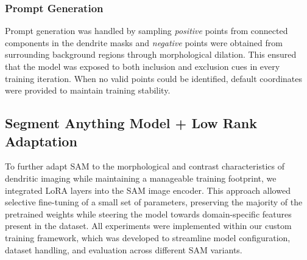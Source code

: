 \subsubsection{\textbf{Prompt Generation}}
Prompt generation was handled by sampling \textit{positive} points from connected components in the dendrite masks and \textit{negative} points were obtained from surrounding background regions through morphological dilation. This ensured that the model was exposed to both inclusion and exclusion cues in every training iteration. When no valid points could be identified, default coordinates were provided to maintain training stability.



\subsection{Segment Anything Model + Low Rank Adaptation}
To further adapt \gls{SAM} to the morphological and contrast characteristics of dendritic imaging while maintaining a manageable training footprint, we integrated \gls{LoRA} layers into the \gls{SAM} image encoder. This approach allowed selective fine-tuning of a small set of parameters, preserving the majority of the pretrained weights while steering the model towards domain-specific features present in the dataset. All experiments were implemented within our custom training framework, which was developed to streamline model configuration, dataset handling, and evaluation across different \gls{SAM} variants.

